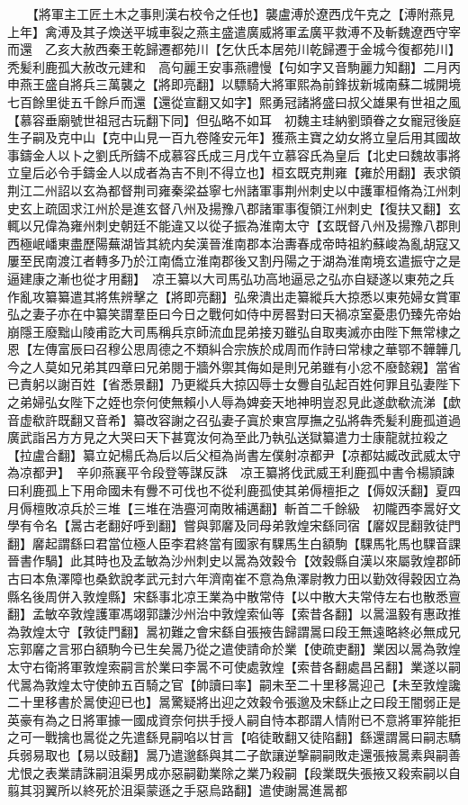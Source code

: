 　　【將軍主工匠土木之事則漢右校令之任也】襲盧溥於遼西戊午克之【溥附燕見上年】禽溥及其子煥送平城車裂之燕主盛遣廣威將軍孟廣平救溥不及斬魏遼西守宰而還　乙亥大赦西秦王乾歸遷都苑川【乞㐲氏本居苑川乾歸遷于金城今復都苑川】　秃髪利鹿孤大赦改元建和　高句麗王安事燕禮慢【句如字又音駒麗力知翻】二月丙申燕王盛自將兵三萬襲之【將即亮翻】以驃騎大將軍熙為前鋒拔新城南蘇二城開境七百餘里徙五千餘戶而還【還從宣翻又如字】熙勇冠諸將盛曰叔父雄果有世祖之風【慕容垂廟號世祖冠古玩翻下同】但弘略不如耳　初魏主珪納劉頭眷之女寵冠後庭生子嗣及克中山【克中山見一百九卷隆安元年】獲燕主寶之幼女將立皇后用其國故事鑄金人以卜之劉氏所鑄不成慕容氏成三月戊午立慕容氏為皇后【北史曰魏故事將立皇后必令手鑄金人以成者為吉不則不得立也】桓玄既克荆雍【雍於用翻】表求領荆江二州詔以玄為都督荆司雍秦梁益寧七州諸軍事荆州刺史以中護軍桓脩為江州刺史玄上疏固求江州於是進玄督八州及揚豫八郡諸軍事復領江州刺史【復扶又翻】玄輒以兄偉為雍州刺史朝廷不能違又以從子振為淮南太守【玄既督八州及揚豫八郡則西極岷嶓東盡歷陽蕪湖皆其統内矣漢晉淮南郡本治夀春成帝時祖約蘇峻為亂胡寇又屢至民南渡江者轉多乃於江南僑立淮南郡後又割丹陽之于湖為淮南境玄遣振守之是逼建康之漸也從才用翻】　凉王纂以大司馬弘功高地逼忌之弘亦自疑遂以東苑之兵作亂攻纂纂遣其將焦辨擊之【將即亮翻】弘衆潰出走纂縱兵大掠悉以東苑婦女賞軍弘之妻子亦在中纂笑謂羣臣曰今日之戰何如侍中房晷對曰天禍凉室憂患仍臻先帝始崩隱王廢黜山陵甫訖大司馬稱兵京師流血昆弟接刃雖弘自取夷滅亦由陛下無常棣之恩【左傳富辰曰召穆公思周德之不類糾合宗族於成周而作詩曰常棣之華鄂不韡韡几今之人莫如兄弟其四章曰兄弟閱于牆外禦其侮如是則兄弟雖有小忿不廢懿親】當省已責躬以謝百姓【省悉景翻】乃更縱兵大掠囚辱士女釁自弘起百姓何罪且弘妻陛下之弟婦弘女陛下之姪也奈何使無賴小人辱為婢妾天地神明豈忍見此遂歔欷流涕【歔音虚欷許既翻又音希】纂改容謝之召弘妻子寘於東宫厚撫之弘將犇秃髪利鹿孤道過廣武詣呂方方見之大哭曰天下甚寛汝何為至此乃執弘送獄纂遣力士康龍就拉殺之【拉盧合翻】纂立妃楊氏為后以后父桓為尚書左僕射凉都尹【凉都姑臧改武威太守為凉都尹】　辛卯燕襄平令段登等謀反誅　凉王纂將伐武威王利鹿孤中書令楊頴諫曰利鹿孤上下用命國未有釁不可伐也不從利鹿孤使其弟傉檀拒之【傉奴沃翻】夏四月傉檀敗凉兵於三堆【三堆在浩亹河南敗補邁翻】斬首二千餘級　初隴西李暠好文學有令名【暠古老翻好呼到翻】嘗與郭黁及同母弟敦煌宋繇同宿【黁奴昆翻敦徒門翻】黁起謂繇曰君當位極人臣李君終當有國家有騍馬生白額駒【騍馬牝馬也騍音課晉書作騧】此其時也及孟敏為沙州刺史以暠為效穀令【效穀縣自漢以來屬敦煌郡師古曰本魚澤障也桑欽說孝武元封六年濟南崔不意為魚澤尉教力田以勤效得穀因立為縣名後周併入敦煌縣】宋繇事北凉王業為中散常侍【以中散大夫常侍左右也散悉亶翻】孟敏卒敦煌護軍馮翊郭謙沙州治中敦煌索仙等【索昔各翻】以暠溫毅有惠政推為敦煌太守【敦徒門翻】暠初難之會宋繇自張掖告歸謂暠曰段王無遠略終必無成兄忘郭黁之言邪白額駒今已生矣暠乃從之遣使請命於業【使疏吏翻】業因以暠為敦煌太守右衛將軍敦煌索嗣言於業曰李暠不可使處敦煌【索昔各翻處昌呂翻】業遂以嗣代暠為敦煌太守使帥五百騎之官【帥讀曰率】嗣未至二十里移暠迎己【未至敦煌讒二十里移書於暠使迎已也】暠驚疑將出迎之效穀令張邈及宋繇止之曰段王闇弱正是英豪有為之日將軍據一國成資奈何拱手授人嗣自恃本郡謂人情附已不意將軍猝能拒之可一戰擒也暠從之先遣繇見嗣啗以甘言【啗徒敢翻又徒陷翻】繇還謂暠曰嗣志驕兵弱易取也【易以豉翻】暠乃遣邈繇與其二子歆讓逆撃嗣嗣敗走還張掖暠素與嗣善尤恨之表業請誅嗣沮渠男成亦惡嗣勸業除之業乃殺嗣【段業既失張掖又殺索嗣以自翦其羽翼所以終死於沮渠蒙遜之手惡烏路翻】遣使謝暠進暠都